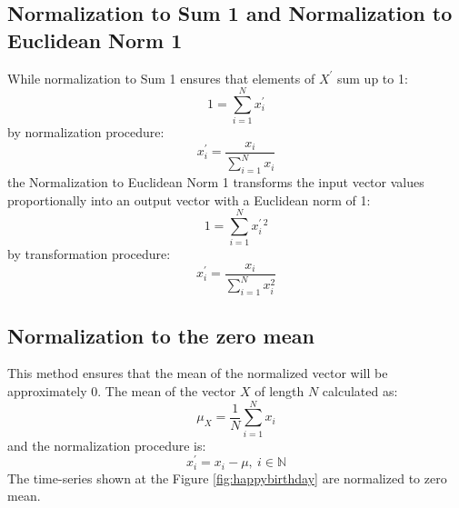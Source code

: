 \subsection{Normalization to Sum 1 and Normalization to Euclidean Norm 1}
While normalization to Sum 1 ensures that elements of $X^{'}$ sum up to 1:
\begin{equation}
1 = \sum_{i=1}^{N} x_{i}^{'}
\end{equation}
by normalization procedure:
\begin{equation}
x_{i}^{'} = \frac{ x_{i} }{ \sum_{i=1}^{N} x_{i} }
\end{equation}
the Normalization to Euclidean Norm 1 transforms the input vector values proportionally into an output vector with a Euclidean norm of 1:
\begin{equation}
1 = \sum_{i=1}^{N} x_{i}^{' \: 2}
\end{equation}
by transformation procedure:
\begin{equation}
x_{i}^{'} = \frac{ x_{i} }{ \sum_{i=1}^{N} x_{i}^2 }
\end{equation}

\subsection{Normalization to the zero mean}
This method ensures that the mean of the normalized vector will be approximately $0$. The mean of the vector $X$ of length $N$ calculated as:
\begin{equation}
\mu_{X} = \frac{1}{N}\sum_{i=1}^{N}x_{i}
\end{equation}
and the normalization procedure is:
\begin{equation}
x_{i}^{'} = x_{i} - \mu, \: i \in \mathbb{N}
\end{equation}
The time-series shown at the Figure \ref{fig:happybirthday} are normalized to zero mean.

